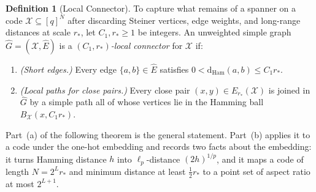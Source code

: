 \documentclass[11pt]{article}
\theoremstyle{definition}
\newtheorem*{definition*}{Definition}
\theoremstyle{remark}
\newcommand{\Ham}{\mathrm{Ham}}
\newcommand{\dHam}{\mathrm{d}_{\Ham}}
\begin{document}
\begin{definition*}[Local Connector]
To capture what remains of a spanner on a code $\mathcal{X} \subseteq [q]^N$ after discarding Steiner vertices, edge weights, and long-range distances at scale $r_*$, let $C_1, r_* \ge 1$ be integers. An unweighted simple graph $\widehat{G} = (\mathcal{X}, \widehat{E})$ is a \emph{$(C_1, r_*)$-local connector} for $\mathcal{X}$ if:
\begin{enumerate}[label=(\arabic*),leftmargin=2em,nosep,topsep=4pt,itemsep=3pt]
  \item \emph{(Short edges.)} Every edge $\{a, b\} \in \widehat{E}$ satisfies $0 < \dHam(a, b) \le C_1 r_*$.
  \item \emph{(Local paths for close pairs.)} Every close pair $(x, y) \in E_{r_*}(\mathcal{X})$ is joined in $\widehat{G}$ by a simple path all of whose vertices lie in the Hamming ball $B_{\mathcal{X}}(x, C_1 r_*)$.
\end{enumerate}
\end{definition*}

Part~(a) of the following theorem is the general statement. Part~(b) applies it to a code under the one-hot embedding and records two facts about the embedding: it turns Hamming distance $h$ into $\ell_p$-distance $(2h)^{1/p}$, and it maps a code of length $N = 2^L r_*$ and minimum distance at least $\frac{1}{2} r_*$ to a point set of aspect ratio at most $2^{L + 1}$.
\end{document}

